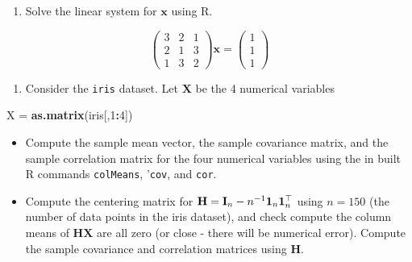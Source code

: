 \documentclass[]{book}
\newenvironment{Shaded}{\begin{snugshade}}{\end{snugshade}}
\newcommand{\CommentTok}[1]{\textcolor[rgb]{0.56,0.35,0.01}{\textit{#1}}}
\newcommand{\DecValTok}[1]{\textcolor[rgb]{0.00,0.00,0.81}{#1}}
\newcommand{\KeywordTok}[1]{\textcolor[rgb]{0.13,0.29,0.53}{\textbf{#1}}}
\newcommand{\NormalTok}[1]{#1}
\newcommand{\OperatorTok}[1]{\textcolor[rgb]{0.81,0.36,0.00}{\textbf{#1}}}
\newcommand{\StringTok}[1]{\textcolor[rgb]{0.31,0.60,0.02}{#1}}
\providecommand{\tightlist}{%
  \setlength{\itemsep}{0pt}\setlength{\parskip}{0pt}}
\theoremstyle{definition}
\theoremstyle{definition}
\theoremstyle{definition}
\theoremstyle{remark}
\begin{document}
\begin{enumerate}
\def\labelenumi{\arabic{enumi}.}
\setcounter{enumi}{1}
\tightlist
\item
  Solve the linear system for \(\boldsymbol x\) using R.
\end{enumerate}

\[\left(\begin{array}{ccc} 3&2&1\\2&1&3\\ 1&3&2\end{array}\right) \boldsymbol x=\left(\begin{array}{c} 1\\1\\ 1\end{array}\right)\]

\begin{enumerate}
\def\labelenumi{\arabic{enumi}.}
\setcounter{enumi}{2}
\tightlist
\item
  Consider the \texttt{iris} dataset. Let \(\boldsymbol X\) be the 4 numerical variables
\end{enumerate}

\begin{Shaded}
\begin{Highlighting}[]
\NormalTok{X =}\StringTok{ }\KeywordTok{as.matrix}\NormalTok{(iris[,}\DecValTok{1}\OperatorTok{:}\DecValTok{4}\NormalTok{])}
\end{Highlighting}
\end{Shaded}

\begin{itemize}
\item
  Compute the sample mean vector, the sample covariance matrix, and the sample correlation matrix for the four numerical variables using the in built R commands \texttt{colMeans}, '\texttt{cov}, and \texttt{cor}.
\item
  Compute the centering matrix for
  \({\bf H}={\bf I}_n-n^{-1}{\bf 1}_n {\bf 1}_n^\top\)
  using \(n=150\) (the number of data points in the iris dataset), and check compute the column means of \(\boldsymbol H\boldsymbol X\) are all zero (or close - there will be numerical error). Compute the sample covariance and correlation matrices using \(\boldsymbol H\).
\end{itemize}

\begin{Shaded}
\end{Shaded}
\end{document}
